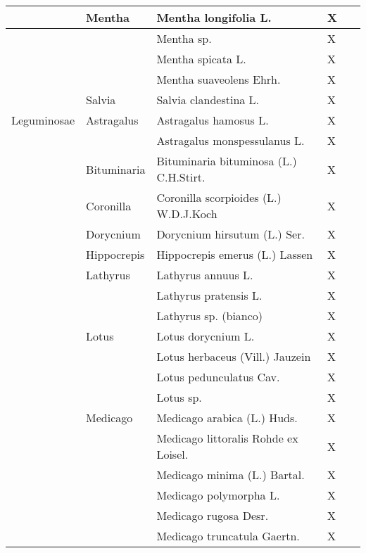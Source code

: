 \documentclass[main.tex]{subfiles}
\begin{document}
        \begin{table}[!ht]
        \centering
    \begin{tabular}[\footnotesize]{|p{2.4cm}|p{1.9cm}|p{5.8cm}|p{1.1cm}|p{1cm}|}
    \hline
        ~ & Mentha & Mentha longifolia L. & X & ~ \\ \hline
        ~ & ~ & Mentha sp. & X & ~ \\ \hline
        ~ & ~ & Mentha spicata L. & X & ~ \\ \hline
        ~ & ~ & Mentha suaveolens Ehrh. & X & ~ \\ \hline
        ~ & Salvia & Salvia clandestina L. & X & ~ \\ \hline
        Leguminosae & Astragalus & Astragalus hamosus L. & X & ~ \\ \hline
        ~ & ~ & Astragalus monspessulanus L. & X & ~ \\ \hline
        ~ & Bituminaria & Bituminaria bituminosa (L.) C.H.Stirt. & X & ~ \\ \hline
        ~ & Coronilla & Coronilla scorpioides (L.) W.D.J.Koch & X & ~ \\ \hline
        ~ & Dorycnium & Dorycnium hirsutum (L.) Ser. & X & ~ \\ \hline
        ~ & Hippocrepis & Hippocrepis emerus (L.) Lassen & X & ~ \\ \hline
        ~ & Lathyrus & Lathyrus annuus L. & X & ~ \\ \hline
        ~ & ~ & Lathyrus pratensis L. & X & ~ \\ \hline
        ~ & ~ & Lathyrus sp. (bianco) & X & ~ \\ \hline
        ~ & Lotus & Lotus dorycnium L. & X & ~ \\ \hline
        ~ & ~ & Lotus herbaceus (Vill.) Jauzein & X & ~ \\ \hline
        ~ & ~ & Lotus pedunculatus Cav. & X & ~ \\ \hline
        ~ & ~ & Lotus sp.  & X & ~ \\ \hline
        ~ & Medicago & Medicago arabica (L.) Huds. & X & ~ \\ \hline
        ~ & ~ & Medicago littoralis Rohde ex Loisel. & X & ~ \\ \hline
        ~ & ~ & Medicago minima (L.) Bartal. & X & ~ \\ \hline
        ~ & ~ & Medicago polymorpha L. & X & ~ \\ \hline
        ~ & ~ & Medicago rugosa Desr. & X & ~ \\ \hline
        ~ & ~ & Medicago truncatula Gaertn. & X & ~ \\ \hline

\end{tabular}
\end{table}
\end{document}
